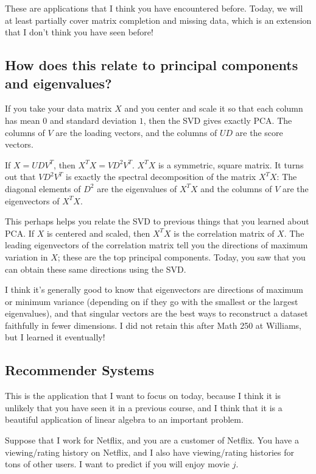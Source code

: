 These are applications that I think you have encountered before. Today, we will at least partially cover matrix completion and missing data, which is an extension that I don't think you have seen before!

\subsection{How does this relate to principal components and eigenvalues?}

If you take your data matrix $X$ and you center and scale it so that each column has mean $0$ and standard deviation $1$, then the SVD gives exactly PCA. The columns of $V$ are the loading vectors, and the columns of $UD$ are the score vectors. 

If $X = UD V^T$, then $X^T X = V D^2 V^T$. $X^T X$ is a symmetric, square matrix. It turns out that $V D^2 V^T$ is exactly the spectral decomposition of the matrix $X^T X$: The diagonal elements of $D^2$ are the eigenvalues of $X^T X$ and the columns of $V$ are the eigenvectors of $X^T X$.

This perhaps helps you relate the SVD to previous things that you learned about PCA. If $X$ is centered and scaled, then $X^T X$ is the correlation matrix of $X$. The leading eigenvectors of the correlation matrix tell you the directions of maximum variation in $X$; these are the top principal components. Today, you saw that you can obtain these same directions using the SVD. 

I think it's generally good to know that eigenvectors are directions of maximum or minimum variance (depending on if they go with the smallest or the largest eigenvalues), and that singular vectors are the best ways to reconstruct a dataset faithfully in fewer dimensions. I did not retain this after Math 250 at Williams, but I learned it eventually!

\subsection{Recommender Systems}

This is the application that I want to focus on today, because I think it is unlikely that you have seen it in a previous course, and I think that it is a beautiful application of linear algebra to an important problem.

Suppose that I work for Netflix, and you are a customer of Netflix. You have a viewing/rating history on Netflix, and I also have viewing/rating histories for tons of other users. I want to predict if you will enjoy movie $j$.

